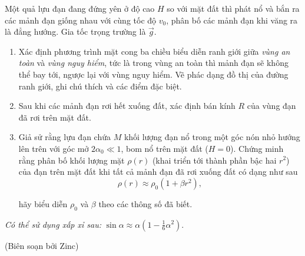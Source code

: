 Một quả lựu đạn đang đứng yên ở độ cao $H$ so với mặt đất thì phát nổ và bắn ra các mảnh đạn giống nhau với cùng tốc độ $v_0$, phân bố các mảnh đạn khi văng ra là đẳng hướng. Gia tốc trọng trường là $\Vec{g}$.
\begin{enumerate}[label=\textbf{\alph*,}]\itemsep0em
    \item Xác định phương trình mặt cong ba chiều biểu diễn ranh giới giữa \textit{vùng an toàn} và \textit{vùng nguy hiểm}, tức là trong vùng an toàn thì mảnh đạn sẽ không thể bay tới, ngược lại với vùng nguy hiểm. Vẽ phác dạng đồ thị của đường ranh giới, ghi chú thích và các điểm đặc biệt.
    \item Sau khi các mảnh đạn rơi hết xuống đất, xác định bán kính $R$ của vùng đạn đã rơi trên mặt đất.
    \item Giả sử rằng lựu đạn chứa $M$ khối lượng đạn nổ trong một góc nón nhỏ hướng lên trên với góc mở $2\alpha_0 \ll 1$, bom nổ trên mặt đất ($H = 0$). Chứng minh rằng phân bố khối lượng mặt $\rho(r)$ (khai triển tới thành phần bậc hai $r^2$) của đạn trên mặt đất khi tất cả mảnh đạn đã rơi xuống đất có dạng như sau
    $$\rho(r) \approx \rho_0 (1 + \beta r^2),$$

    hãy biểu diễn $\rho_0$ và $\beta$ theo các thông số đã biết.
\end{enumerate}

\textit{Có thể sử dụng xấp xỉ sau:} $\displaystyle \sin \alpha \approx \alpha \left(1 - \frac{1}{6} \alpha^2 \right)$.

\begin{flushright}
    (Biên soạn bởi Zinc)
\end{flushright}
